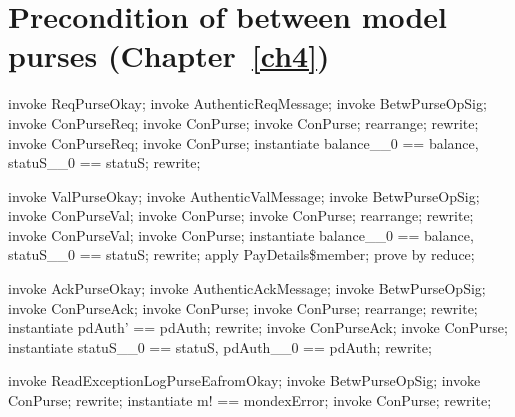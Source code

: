 \section{Precondition of between model purses (Chapter~\ref{ch4})}


\begin{LPScript}\begin{zproof}[tReqPurseOkayPRE]
    invoke ReqPurseOkay;
    invoke AuthenticReqMessage;
    invoke BetwPurseOpSig;
    invoke \Xi ConPurseReq;
    invoke \Delta ConPurse;
    invoke ConPurse;
    rearrange;
    rewrite;
    invoke ConPurseReq;
    invoke ConPurse;
    instantiate balance\_\_0 == balance, statuS\_\_0 == statuS;
    rewrite;
\end{zproof}\end{LPScript}

\begin{LPScript}\begin{zproof}[tValPurseOkayPRE]
    invoke ValPurseOkay;
    invoke AuthenticValMessage;
    invoke BetwPurseOpSig;
    invoke \Xi ConPurseVal;
    invoke \Delta ConPurse;
    invoke ConPurse;
    rearrange;
    rewrite;
    invoke ConPurseVal;
    invoke ConPurse;
    instantiate balance\_\_0 == balance, statuS\_\_0 == statuS;
    rewrite;
    apply PayDetails\$member;
    prove by reduce;
\end{zproof}\end{LPScript}

\begin{LPScript}\begin{zproof}[tAckPurseOkayPRE]
    invoke AckPurseOkay;
    invoke AuthenticAckMessage;
    invoke BetwPurseOpSig;
    invoke \Xi ConPurseAck;
    invoke \Delta ConPurse;
    invoke ConPurse;
    rearrange;
    rewrite;
    instantiate pdAuth' == pdAuth;
    rewrite;
    invoke ConPurseAck;
    invoke ConPurse;
    instantiate statuS\_\_0 == statuS, pdAuth\_\_0 == pdAuth;
    rewrite;
\end{zproof}\end{LPScript}

\begin{LPScript}\begin{zproof}[tReadExceptionLogPurseEafromOkayPRE]
    invoke ReadExceptionLogPurseEafromOkay;
    invoke BetwPurseOpSig;
    invoke \Xi ConPurse;
    rewrite;
    instantiate m! == mondexError;
    invoke ConPurse;
    rewrite;
\end{zproof}\end{LPScript}

